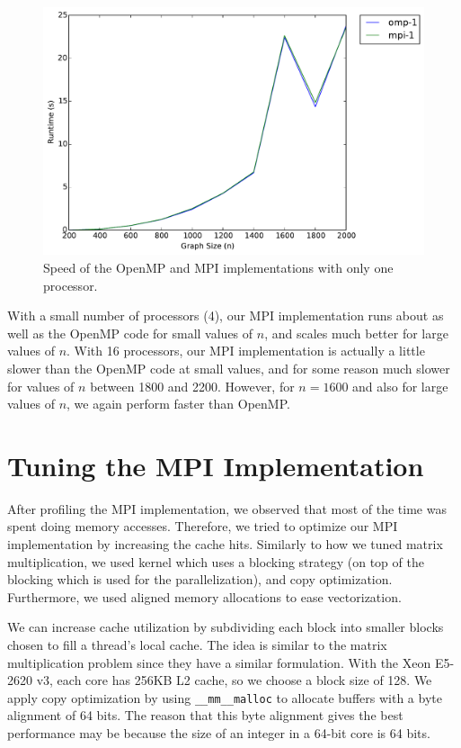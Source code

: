 \documentclass[11pt]{article}
\begin{document}
\begin{figure}[h]
	\centering
	\includegraphics[width=.6\textwidth]{serial.pdf}
	\caption{Speed of the OpenMP and MPI implementations with only one processor.}
	\label{fig:serial}
\end{figure}

With a small number of processors (4), our MPI implementation runs about as well as the OpenMP code for small values of $n$, and scales much better for large values of $n$.
With 16 processors, our MPI implementation is actually a little slower than the OpenMP code at small values, and for some reason much slower for values of $n$ between 1800 and 2200.
However, for $n = 1600$ and also for large values of $n$, we again perform faster than OpenMP.


\section{Tuning the MPI Implementation}
After profiling the MPI implementation, we observed that most of the time was spent doing memory accesses. Therefore, we tried to optimize our MPI implementation by increasing the cache hits. 
Similarly to how we tuned matrix multiplication, we used kernel which uses a blocking strategy (on top of the blocking which is used for the parallelization), and copy optimization. 
Furthermore, we used aligned memory allocations to ease vectorization. 


We can increase cache utilization by subdividing each block into smaller blocks chosen to fill a thread's local cache.
The idea is similar to the matrix multiplication problem since they have a similar formulation.
With the Xeon E5-2620 v3, each core has 256KB L2 cache, so we choose a block size of 128. 
We apply copy optimization by using \texttt{\_\_mm\_\_malloc} to allocate buffers with a byte alignment of 64 bits. 
The reason that this byte alignment gives the best performance may be because the size of an integer in a 64-bit core is 64 bits. 
\end{document}
